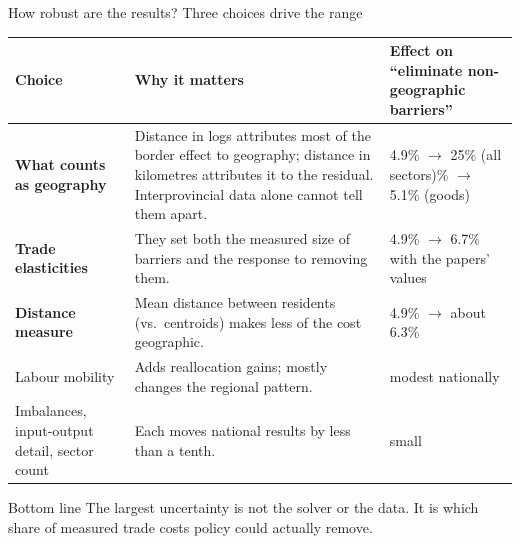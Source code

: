 \documentclass[aspectratio=169,9pt,t]{beamer}
\begin{document}
\begin{frame}{How robust are the results? Three choices drive the range}
  \small
  \begin{tabular}{@{}L{0.2\textwidth}L{0.42\textwidth}L{0.32\textwidth}@{}}
    \toprule
    Choice & Why it matters & Effect on ``eliminate non-geographic
      barriers''\\
    \midrule
    \textbf{What counts as geography}
      & Distance in logs attributes most of the border effect to
        geography; distance in kilometres attributes it to the residual.
        Interprovincial data alone cannot tell them apart.
      & 4.9\% $\rightarrow$ \alert{25\%} (all sectors)\% $\rightarrow$ 5.1\% (goods)\\
    \addlinespace
    \textbf{Trade elasticities}
      & They set both the measured size of barriers and the response to
        removing them.
      & 4.9\% $\rightarrow$ 6.7\% with the papers' values\\
    \addlinespace
    \textbf{Distance measure}
      & Mean distance between residents (vs.\ centroids) makes less of
        the cost geographic.
      & 4.9\% $\rightarrow$ about 6.3\%\\
    \addlinespace
    Labour mobility
      & Adds reallocation gains; mostly changes the regional pattern.
      & modest nationally\\
    \addlinespace
    Imbalances, input-output detail, sector count
      & Each moves national results by less than a tenth.
      & small\\
    \bottomrule
  \end{tabular}

  \smallskip
  \begin{block}{Bottom line}
    The largest uncertainty is not the solver or the data. It is which
    share of measured trade costs policy could actually remove.
  \end{block}
\end{frame}
\end{document}
